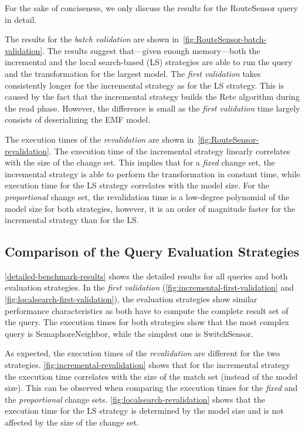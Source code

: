 \documentclass[submission,copyright,creativecommons]{eptcs}
\begin{document}
For the sake of conciseness, we only discuss the results for the \textsf{RouteSensor} query in detail. 

The results for the \emph{batch validation} are shown in~\autoref{fig:RouteSensor-batch-validation}. The results suggest that---given enough memory---both the incremental and the local search-based (LS) strategies are able to run the query and the transformation for the largest model. The \emph{first validation} takes consistently longer for the incremental strategy as for the LS strategy. This is caused by the fact that the incremental strategy builds the Rete algorithm during the \textsf{read} phase. However, the difference is small as the \emph{first validation} time largely consists of deserializing the EMF model.

The execution times of the \emph{revalidation} are shown in~\autoref{fig:RouteSensor-revalidation}. The execution time of the incremental strategy linearly correlates with the size of the change set. This implies that for a \emph{fixed} change set, the incremental strategy is able to perform the transformation in constant time, while execution time for the LS strategy correlates with the model size. For the \emph{proportional} change set, the revalidation time is a low-degree polynomial of the model size for both strategies, however, it is an order of magnitude faster for the incremental strategy than for the LS.

\subsection{Comparison of the Query Evaluation Strategies}

\autoref{detailed-benchmark-results} shows the detailed results for all queries and both evaluation strategies. In the \emph{first validation} (\autoref{fig:incremental-first-validation} and \autoref{fig:localsearch-first-validation}), the evaluation strategies show similar performance characteristics as both have to compute the complete result set of the query. The execution times for both strategies show that the most complex query is \textsf{SemaphoreNeighbor}, while the simplest one is \textsf{SwitchSensor}. 

As expected, the execution times of the \emph{revalidation} are different for the two strategies. \autoref{fig:incremental-revalidation} shows that for the incremental strategy the execution time correlates with the size of the match set (instead of the model size). This can be observed when comparing the execution times for the \emph{fixed} and the \emph{proportional} change sets. \autoref{fig:localsearch-revalidation} shows that the execution time for the LS strategy is determined by the model size and is not affected by the size of the change set.
\end{document}

